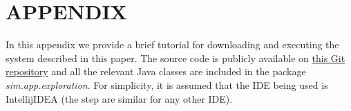 \documentclass[a4paper, 10pt, conference]{ieeeconf}      %
\begin{document}






\section*{APPENDIX}
In this appendix we provide a brief tutorial for downloading and executing the system described in this paper. The source code is publicly available on \href{https://gitlab.com/Telemaco019/ai-exploration-project}{this Git repository} and all the relevant Java classes are included in the package \emph{sim.app.exploration}. For simplicity, it is assumed that the IDE being used is IntellijIDEA \cite{intellij} (the step are similar for any other IDE). 
\end{document}
